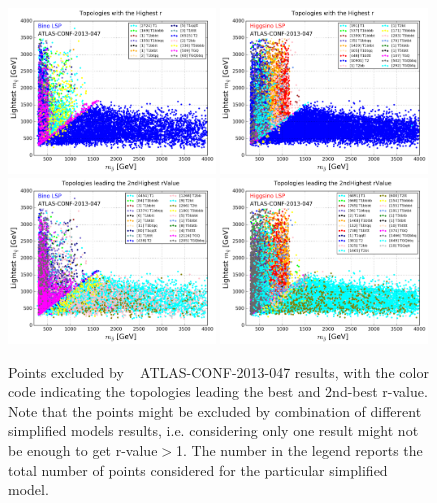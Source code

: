 \documentclass[a4paper,11pt]{article}
\begin{document}
\begin{figure}[!b]
	\centering
	\subfigure
	{ \includegraphics[width=0.49\textwidth]{Fig/FastLim/BinoTxNames_Scatter_Best_All_LightS_All.png}}
	\subfigure
	{\includegraphics[width=0.49\textwidth]{Fig/FastLim/HiggsinoTxNames_Scatter_Best_All_LightS_All.png}}
	\subfigure
	{ \includegraphics[width=0.49\textwidth]{Fig/FastLim/BinoTxNames_Scatter_2ndBest_All_LightS_All.png}}
	\subfigure
	{\includegraphics[width=0.49\textwidth]{Fig/FastLim/HiggsinoTxNames_Scatter_2ndBest_All_LightS_All.png}}
	\caption{Points excluded by \FastLim~ ATLAS-CONF-2013-047 results, with the color code indicating the topologies leading the best and 2nd-best r-value. Note that the points might be excluded by combination of different simplified models results, i.e. considering only one result might not be enough to get r-value$>$1. The number in the legend reports the total number of points considered for the particular simplified model. }
	\label{fastlim}
	
	
\end{figure}
\end{document}
